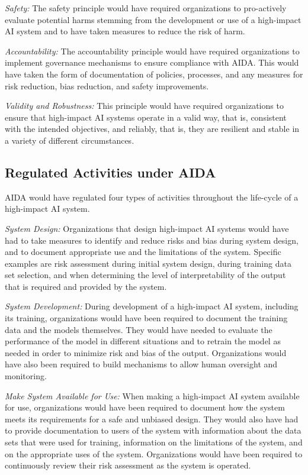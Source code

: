 \begin{advanced}
\emph{Safety:} The safety principle would have required organizations to pro-actively evaluate potential harms stemming from the development or use of a high-impact AI system and to have taken measures to reduce the risk of harm.

\emph{Accountability:} The accountability principle would have required organizations to implement governance mechanisms to ensure compliance with AIDA. This would have taken the form of documentation of policies, processes, and any measures for risk reduction, bias reduction, and safety improvements. 

\emph{Validity and Robustness:} This principle would have required organizations to ensure that high-impact AI systems operate in a valid way, that is, consistent with the intended objectives, and reliably, that is, they are resilient and stable in a variety of different circumstances. 

\subsection*{Regulated Activities under AIDA}

AIDA would have regulated four types of activities throughout the life-cycle of a high-impact AI system.

\emph{System Design:} Organizations that design high-impact AI systems would have had to take measures to identify and reduce risks and bias during system design, and to document appropriate use and the limitations of the system. Specific examples are risk assessment during initial system design, during training data set selection, and when determining the level of interpretability of the output that is required and provided by the system.

\emph{System Development:} During development of a high-impact AI system, including its training, organizations would have been required to document the training data and the models themselves. They would have needed to evaluate the performance of the model in different situations and to retrain the model as needed in order to minimize risk and bias of the output. Organizations would have also been required to build mechanisms to allow human oversight and monitoring.

\emph{Make System Available for Use:} When making a high-impact AI system available for use, organizations would have been required to document how the system meets its requirements for a safe and unbiased design. They would also have had to provide documentation to users of the system with information about the data sets that were used for training, information on the limitations of the system, and on the appropriate uses of the system. Organizations would have been required to continuously review their risk assessment as the system is operated.


\end{advanced}
